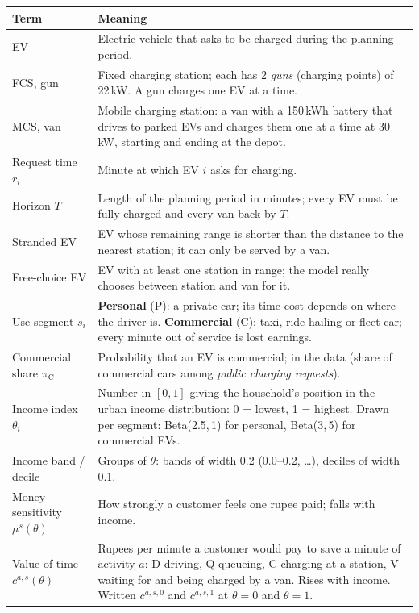 \begin{xltabular}{\textwidth}{@{}>{\raggedright\arraybackslash}p{4.0cm}X@{}}
\toprule
\textbf{Term} & \textbf{Meaning} \\
\midrule
\endhead
EV & Electric vehicle that asks to be charged during the planning period. \\
FCS, gun & Fixed charging station; each has 2 \emph{guns} (charging points) of 22\,kW. A gun charges one EV at a time. \\
MCS, van & Mobile charging station: a van with a 150\,kWh battery that drives to parked EVs and charges them one at a time at 30\,kW, starting and ending at the depot. \\
Request time $r_i$ & Minute at which EV $i$ asks for charging. \\
Horizon $T$ & Length of the planning period in minutes; every EV must be fully charged and every van back by $T$. \\
Stranded EV & EV whose remaining range is shorter than the distance to the nearest station; it can only be served by a van. \\
Free-choice EV & EV with at least one station in range; the model really chooses between station and van for it. \\
Use segment $s_i$ & \textbf{Personal} (P): a private car; its time cost depends on where the driver is. \textbf{Commercial} (C): taxi, ride-hailing or fleet car; every minute out of service is lost earnings. \\
Commercial share $\pi_{\mathrm C}$ & Probability that an EV is commercial; \PiC{} in the data (share of commercial cars among \emph{public charging requests}). \\
Income index $\theta_i$ & Number in $[0,1]$ giving the household's position in the urban income distribution: 0 = lowest, 1 = highest. Drawn per segment: Beta(2.5,\,1) for personal, Beta(3,\,5) for commercial EVs. \\
Income band / decile & Groups of $\theta$: bands of width 0.2 (0.0--0.2, \dots), deciles of width 0.1. \\
Money sensitivity $\mu^{s}(\theta)$ & How strongly a customer feels one rupee paid; falls with income. \\
Value of time $c^{a,s}(\theta)$ & Rupees per minute a customer would pay to save a minute of activity $a$: D driving, Q queueing, C charging at a station, V waiting for and being charged by a van. Rises with income. Written $c^{a,s,0}$ and $c^{a,s,1}$ at $\theta=0$ and $\theta=1$. \\

\end{xltabular}

